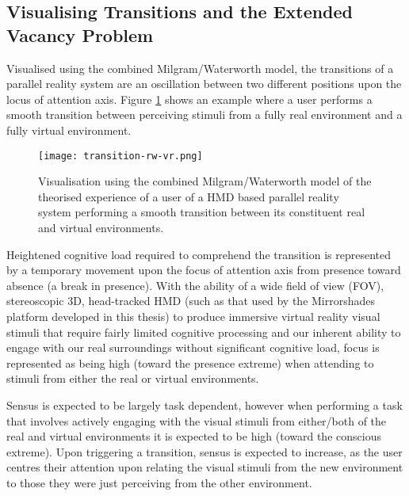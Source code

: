 
\subsection{Visualising Transitions and the Extended Vacancy Problem}
\label{visualising-transitions-extended-vacancy}
Visualised using the combined Milgram/Waterworth model, the transitions of a parallel reality system are an oscillation between two different positions upon the locus of attention axis. Figure \ref{focus-locus-sensus-with-virtuality-continuum-with-transition} shows an example where a user performs a smooth transition between perceiving stimuli from a fully real environment and a fully virtual environment.

\begin{figure}[h]
	\begin{center}
		\texttt{[image: transition-rw-vr.png]}
		\caption{Visualisation using the combined Milgram/Waterworth model of the theorised experience of a user of a HMD based parallel reality system performing a smooth transition between its constituent real and virtual environments.}
		\label{focus-locus-sensus-with-virtuality-continuum-with-transition}
	\end{center}	
\end{figure}

Heightened cognitive load required to comprehend the transition is represented by a temporary movement upon the focus of attention axis from presence toward absence (a break in presence). With the ability of a wide field of view (FOV), stereoscopic 3D, head-tracked HMD (such as that used by the Mirrorshades platform developed in this thesis) to produce immersive virtual reality visual stimuli that require fairly limited cognitive processing and our inherent ability to engage with our real surroundings without significant cognitive load, focus is represented as being high (toward the presence extreme) when attending to stimuli from either the real or virtual environments.

Sensus is expected to be largely task dependent, however when performing a task that involves actively engaging with the visual stimuli from either/both of the real and virtual environments it is expected to be high (toward the conscious extreme). Upon triggering a transition, sensus is expected to increase, as the user centres their attention upon relating the visual stimuli from the new environment to those they were just perceiving from the other environment.


